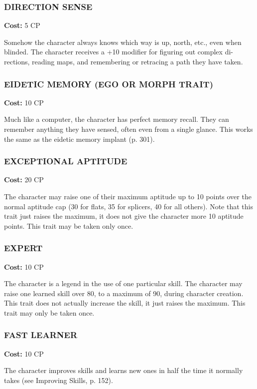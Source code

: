 \subsubsection{DIRECTION SENSE}
\textbf{Cost:} 5 CP

Somehow the character always knows which way is up, north, etc., even when
blinded. The character receives a +10 modifier for figuring out complex di-
rections, reading maps, and remembering or retracing a path they have taken.

\subsubsection{EIDETIC MEMORY (EGO OR MORPH TRAIT)}
\textbf{Cost:} 10 CP

Much like a computer, the character has perfect memory recall. They can
remember anything they have sensed, often even from a single glance. This works
the same as the eidetic memory implant (p. 301).

\subsubsection{EXCEPTIONAL APTITUDE}
\textbf{Cost:} 20 CP

The character may raise one of their maximum aptitude up to 10 points over the
normal aptitude cap (30 for flats, 35 for splicers, 40 for all others). Note
that this trait just raises the maximum, it does not give the character more 10
aptitude points. This trait may be taken only once.

\subsubsection{EXPERT}
\textbf{Cost:} 10 CP

The character is a legend in the use of one particular skill. The character may
raise one learned skill over 80, to a maximum of 90, during character
creation. This trait does not actually increase the skill, it just raises the
maximum. This trait may only be taken once.

\subsubsection{FAST LEARNER}
\textbf{Cost:} 10 CP

The character improves skills and learns new ones in half the time it normally
takes (see Improving Skills, p. 152).

